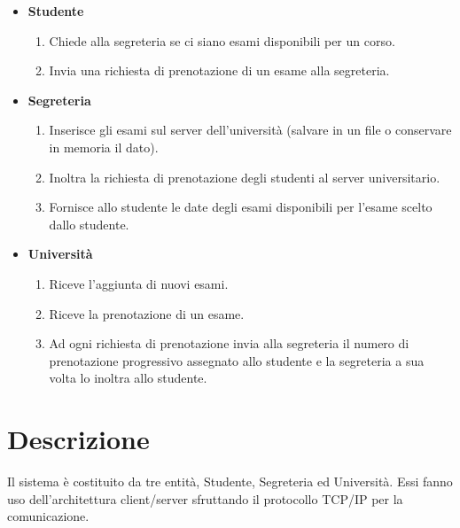 \documentclass[12pt]{article}
\begin{document}
\begin{itemize}
    \item \textbf{Studente}
    \begin{enumerate}
        \item Chiede alla segreteria se ci siano esami disponibili per un corso.
        \item Invia una richiesta di prenotazione di un esame alla segreteria.
    \end{enumerate}
    \item \textbf{Segreteria}
    \begin{enumerate}
       \item Inserisce gli esami sul server dell'università (salvare in un file o conservare in memoria il dato).
       \item Inoltra la richiesta di prenotazione degli studenti al server universitario.
       \item Fornisce allo studente le date degli esami disponibili per l'esame scelto dallo studente.
    \end{enumerate}
    \item \textbf{Università}
    \begin{enumerate}
       \item Riceve l'aggiunta di nuovi esami.
       \item Riceve la prenotazione di un esame.
       \item Ad ogni richiesta di prenotazione invia alla segreteria il numero di prenotazione progressivo assegnato allo studente e la segreteria a sua volta lo inoltra allo studente.
    \end{enumerate}
\end{itemize}

\newpage

\section{Descrizione}
Il sistema è costituito da tre entità, Studente, Segreteria ed Università.\newline\newline
Essi fanno uso dell'architettura client/server sfruttando il protocollo TCP/IP per la comunicazione.
\end{document}
